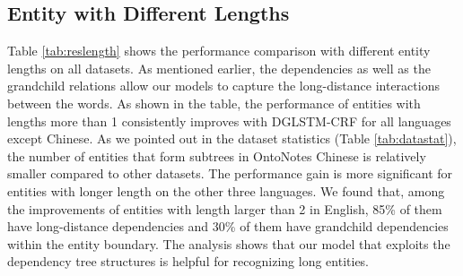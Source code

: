 \subsection{Entity with Different Lengths}
Table \ref{tab:reslength} shows the performance comparison with different entity lengths on all datasets. 
As mentioned earlier, the dependencies as well as the grandchild relations allow our models to capture the long-distance interactions between the words. 
As shown in the table, the performance of entities with lengths more than 1 consistently improves with DGLSTM-CRF for all languages except Chinese.
As we pointed out in the dataset statistics (Table \ref{tab:datastat}),  the number of entities that form subtrees in OntoNotes Chinese is relatively smaller compared to other datasets.
The performance gain is more significant for entities with longer length on the other three languages. 
We found that, among the improvements of entities with length larger than 2 in English, 85\% of them have long-distance dependencies and 30\% of them have grandchild dependencies within the entity boundary. 
The analysis shows that our model that exploits the dependency tree structures is helpful for recognizing long entities.
%



